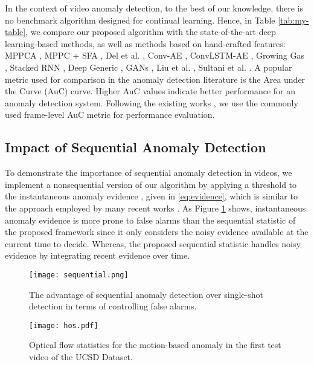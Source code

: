 In the context of video anomaly detection, to the best of our knowledge, there is no benchmark algorithm designed for continual learning. Hence, in Table \ref{tab:my-table}, we compare our proposed algorithm with the state-of-the-art deep learning-based methods, as well as methods based on hand-crafted features: MPPCA \cite{kim2009observe}, MPPC + SFA \cite{mahadevan2010anomaly}, Del et al. \cite{del2016discriminative}, Conv-AE \cite{hasan2016learning}, ConvLSTM-AE \cite{luo2017remembering}, Growing Gas \cite{sun2017online}, Stacked RNN \cite{luo2017revisit}, Deep Generic \cite{hinami2017joint}, GANs \cite{ravanbakhsh2018plug}, Liu et al. \cite{liu2018future}, Sultani et al. \cite{sultani2018real}. A popular metric used for comparison in the anomaly detection literature is the Area under the Curve (AuC) curve. Higher AuC values indicate better performance for an anomaly detection system. Following the existing works \cite{cong2011sparse,ionescu2019object,liu2018future}, we use the commonly used frame-level AuC metric for performance evaluation. 

\subsection{Impact of Sequential Anomaly Detection}

To demonstrate the importance of sequential anomaly detection in videos, we implement a nonsequential version of our algorithm by applying a threshold to the instantaneous anomaly evidence , given in \eqref{eq:evidence}, which is similar to the approach employed by many recent works \cite{liu2018future,sultani2018real,ionescu2019object}. As Figure \ref{f:sequential} shows, instantaneous anomaly evidence is more prone to false alarms than the sequential statistic of the proposed framework since it only considers the noisy evidence available at the current time to decide. Whereas, the proposed sequential statistic handles noisy evidence by integrating recent evidence over time. 

\begin{figure}[th]
\centering
\texttt{[image: sequential.png]}
\vspace{-2mm}
\caption{The advantage of sequential anomaly detection over single-shot detection in terms of controlling false alarms.}
\label{f:sequential}
\vspace{-2mm}
\end{figure}

\begin{figure}[th]
\centering
\texttt{[image: hos.pdf]}
\vspace{-2mm}
\caption{Optical flow statistics for the motion-based anomaly in the first test video of the UCSD Dataset.}
\label{f:hos}
\vspace{-2mm}
\end{figure}
